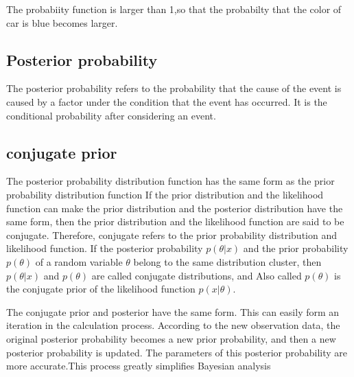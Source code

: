 The probabiity function is larger than 1,so that the probabilty that the color of car is blue becomes  larger.

\subsection{Posterior probability}
The posterior probability refers to the probability that the cause of the event is caused by a factor under the condition that the event has occurred. It is the conditional probability after considering an event.

\subsection{conjugate prior}
The posterior probability distribution function has the same form as the prior probability distribution function
If the prior distribution and the likelihood function can make the prior distribution and the posterior distribution  have the same form, then the prior distribution and the likelihood function are said to be conjugate. Therefore, conjugate refers to the prior probability distribution and likelihood function. If the posterior probability $p(\theta|x)$ and the  prior probability $p(\theta)$ of a random variable $\theta$ belong to the same distribution cluster, then $p(\theta|x)$ and $p(\theta)$ are called conjugate distributions, and  Also called $p(\theta)$ is the conjugate prior of the likelihood function $p(x|\theta)$.

The conjugate prior and posterior have the same form. This can easily form an iteration in the calculation process. According to the new observation data, the original posterior probability becomes a new prior probability, and then a new posterior probability is updated. The parameters of this posterior probability are more accurate.This process greatly simplifies Bayesian analysis
